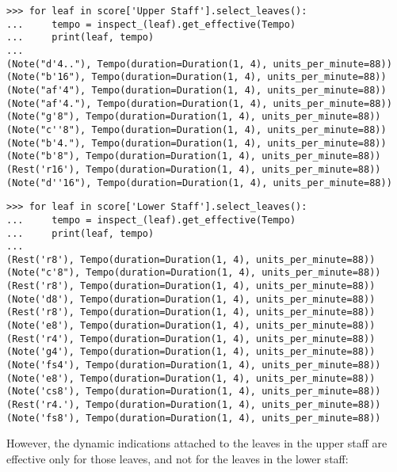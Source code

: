 \begin{abjadbookoutput}
\begin{singlespacing}
\vspace{-0.5\baselineskip}
\begin{verbatim}
>>> for leaf in score['Upper Staff'].select_leaves():
...     tempo = inspect_(leaf).get_effective(Tempo)
...     print(leaf, tempo)
...
(Note("d'4.."), Tempo(duration=Duration(1, 4), units_per_minute=88))
(Note("b'16"), Tempo(duration=Duration(1, 4), units_per_minute=88))
(Note("af'4"), Tempo(duration=Duration(1, 4), units_per_minute=88))
(Note("af'4."), Tempo(duration=Duration(1, 4), units_per_minute=88))
(Note("g'8"), Tempo(duration=Duration(1, 4), units_per_minute=88))
(Note("c''8"), Tempo(duration=Duration(1, 4), units_per_minute=88))
(Note("b'4."), Tempo(duration=Duration(1, 4), units_per_minute=88))
(Note("b'8"), Tempo(duration=Duration(1, 4), units_per_minute=88))
(Rest('r16'), Tempo(duration=Duration(1, 4), units_per_minute=88))
(Note("d''16"), Tempo(duration=Duration(1, 4), units_per_minute=88))
\end{verbatim}
\begin{verbatim}
>>> for leaf in score['Lower Staff'].select_leaves():
...     tempo = inspect_(leaf).get_effective(Tempo)
...     print(leaf, tempo)
...
(Rest('r8'), Tempo(duration=Duration(1, 4), units_per_minute=88))
(Note("c'8"), Tempo(duration=Duration(1, 4), units_per_minute=88))
(Rest('r8'), Tempo(duration=Duration(1, 4), units_per_minute=88))
(Note('d8'), Tempo(duration=Duration(1, 4), units_per_minute=88))
(Rest('r8'), Tempo(duration=Duration(1, 4), units_per_minute=88))
(Note('e8'), Tempo(duration=Duration(1, 4), units_per_minute=88))
(Rest('r4'), Tempo(duration=Duration(1, 4), units_per_minute=88))
(Note('g4'), Tempo(duration=Duration(1, 4), units_per_minute=88))
(Note('fs4'), Tempo(duration=Duration(1, 4), units_per_minute=88))
(Note('e8'), Tempo(duration=Duration(1, 4), units_per_minute=88))
(Note('cs8'), Tempo(duration=Duration(1, 4), units_per_minute=88))
(Rest('r4.'), Tempo(duration=Duration(1, 4), units_per_minute=88))
(Note('fs8'), Tempo(duration=Duration(1, 4), units_per_minute=88))
\end{verbatim}
\end{singlespacing}
\end{abjadbookoutput}

\noindent However, the dynamic indications attached to the leaves in the upper
staff are effective only for those leaves, and not for the leaves in the lower
staff:

